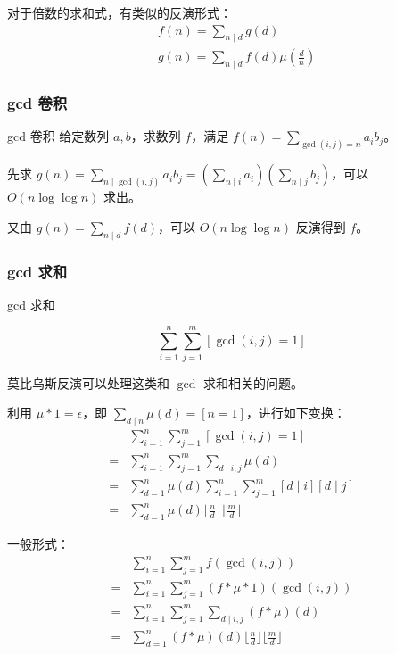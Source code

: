 \documentclass[../main.tex]{subfiles}
\begin{document}
\begin{frame}
对于倍数的求和式，有类似的反演形式：
$$
\begin{aligned}
& f(n)=\sum_{n\mid d}g(d)\\
& g(n)=\sum_{n\mid d} f(d)\mu(\frac{d}{n})
\end{aligned}
$$
\end{frame}

\subsubsection{gcd 卷积}

\begin{frame}{gcd 卷积}
给定数列 $a,b$，求数列 $f$，满足 $f(n)=\sum\limits_{\gcd(i,j)=n}a_ib_j$。\pause
\bigskip

先求 $g(n)=\sum\limits_{n\mid \gcd(i,j)}a_ib_j=(\sum\limits_{n\mid i}a_i)(\sum\limits_{n\mid j}b_j)$，可以 $O(n\log\log n)$ 求出。\pause

又由 $g(n)=\sum\limits_{n\mid d}f(d)$，可以 $O(n\log\log n)$ 反演得到 $f$。
\end{frame}

\subsubsection{gcd 求和}

\begin{frame}{gcd 求和}
\begin{eg}[引例]
$$
\sum_{i=1}^n\sum_{j=1}^m[\gcd(i,j)=1]
$$
\end{eg}\pause

莫比乌斯反演可以处理这类和 $\gcd$ 求和相关的问题。
\end{frame}

\begin{frame}
利用 $\mu*1=\epsilon$，即 $\sum\limits_{d\mid n}\mu(d)=[n=1]$，进行如下变换：
$$
\begin{aligned}
&\sum_{i=1}^n\sum_{j=1}^m[\gcd(i,j)=1]\\ 
=&\sum_{i=1}^n\sum_{j=1}^m\sum_{d\mid i,j}\mu(d)\\ 
=&\sum_{d=1}^n\mu(d)\sum_{i=1}^n\sum_{j=1}^m[d\mid i][d\mid j]\\
=&\sum_{d=1}^n\mu(d)\lfloor\frac{n}{d}\rfloor\lfloor\frac{m}{d}\rfloor
\end{aligned}
$$
\end{frame}

\begin{frame}
一般形式：
$$
\begin{aligned}
&\sum_{i=1}^n\sum_{j=1}^m f(\gcd(i,j))\\
=&\sum_{i=1}^n\sum_{j=1}^m(f*\mu*1)(\gcd(i,j))\\
=&\sum_{i=1}^n\sum_{j=1}^m\sum_{d\mid i,j}(f*\mu)(d)\\
=&\sum_{d=1}^n(f*\mu)(d)\lfloor\frac{n}{d}\rfloor\lfloor\frac{m}{d}\rfloor
\end{aligned}
$$
\end{frame}
\end{document}
